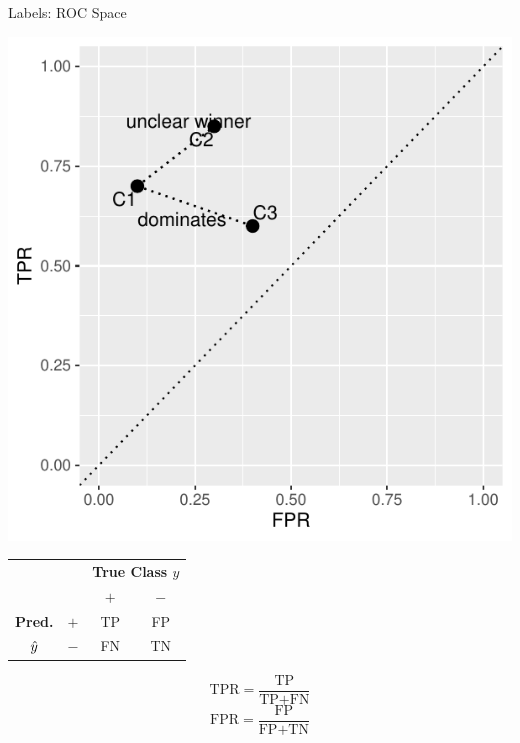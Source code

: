 \documentclass[11pt,compress,t,notes=noshow, xcolor=table]{beamer}
\begin{document}
\begin{vbframe}{Labels: ROC Space}
\begin{minipage}[c]{0.5\textwidth}
  \begin{knitrout}
    \scriptsize
    \color{fgcolor}
    {\centering \includegraphics[width=\textwidth]{figure/eval_mclass_roc_sp_1}}
  \end{knitrout}
\end{minipage}%
\begin{minipage}[c]{0.5\textwidth}
\begin{center}
  \small
  \begin{tabular}{cc|cc}
    & & \multicolumn{2}{c}{\bfseries True Class $y$} \\
    & & $+$ & $-$ \\
    \hline
    \bfseries Pred.     & $+$ & TP & FP \\
              $\hat{y}$ & $-$ & FN & TN \\
\end{tabular}
\lz
$$\text{TPR} = \frac{\text{TP}}{\text{TP} + \text{FN}}$$
$$\text{FPR} = \frac{\text{FP}}{\text{FP} + \text{TN}}$$
\end{center}
\end{minipage}

\end{vbframe}
\end{document}

